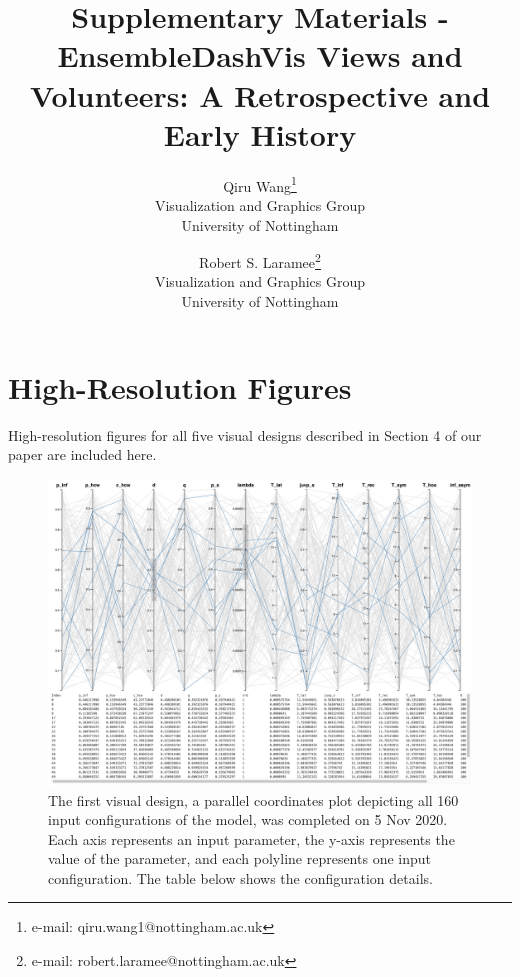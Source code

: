 \documentclass{article}
\title{Supplementary Materials - EnsembleDashVis Views and Volunteers: A Retrospective and Early History}
\author{Qiru Wang\thanks{e-mail: qiru.wang1@nottingham.ac.uk}\\ %
\scriptsize Visualization and Graphics Group \\
        \scriptsize University of Nottingham %
\and Robert S. Laramee\thanks{e-mail: robert.laramee@nottingham.ac.uk}\\ %
\scriptsize Visualization and Graphics Group \\
        \scriptsize University of Nottingham 
}
\date{}
\begin{document}
\maketitle

\section{High-Resolution Figures}

High-resolution figures for all five visual designs described in Section 4 of our paper are included here.

\begin{figure}[h!]
    \centering
    \includegraphics[width=\linewidth]{figures/pc1.png}
    \caption{The first visual design, a parallel coordinates plot depicting all 160 input configurations of the model, was completed on 5 Nov 2020. 
    Each axis represents an input parameter, the y-axis represents the value of the parameter, and each polyline represents one input configuration.
    The table below shows the configuration details.
    }
    \label{fig:pc1}

\end{figure}
\end{document}
